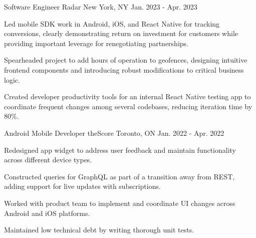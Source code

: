

\begin{cventries}

  \cventry
    {Software Engineer} %
    {Radar} %
    {New York, NY} %
    {Jan. 2023 - Apr. 2023} %
    {
      \begin{cvitems} %
        \item {Led mobile SDK work in Android, iOS, and React Native for tracking conversions, clearly demonstrating return on investment for customers while providing important leverage for renegotiating partnerships.}
        \item {Spearheaded project to add hours of operation to geofences, designing intuitive frontend components and introducing robust modifications to critical business logic.}
        \item {Created developer productivity tools for an internal React Native testing app to coordinate frequent changes among several codebases, reducing iteration time by 80\%.}
      \end{cvitems}
    }

  \cventry
    {Android Mobile Developer} %
    {theScore} %
    {Toronto, ON} %
    {Jan. 2022 - Apr. 2022} %
    {
      \begin{cvitems} %
        \item {Redesigned app widget to address user feedback and maintain functionality across different device types.}
        \item {Constructed queries for GraphQL as part of a transition away from REST, adding support for live updates with subscriptions.}
        \item {Worked with product team to implement and coordinate UI changes across Android and iOS platforms.}
        \item {Maintained low technical debt by writing thorough unit tests.}
      \end{cvitems}
    }


\end{cventries}
